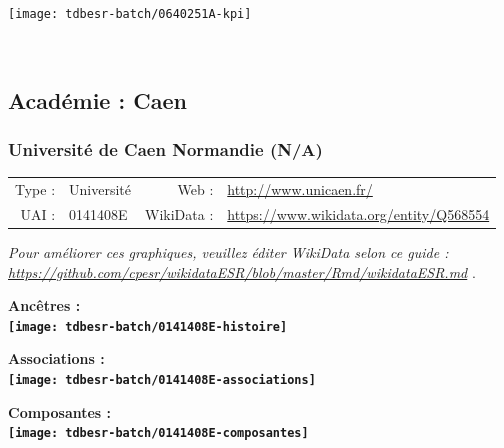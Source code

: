 \documentclass[12pt,french,]{article}
\begin{document}
\begin{center}\texttt{[image: tdbesr-batch/0640251A-kpi]} \end{center}\checkoddpage

\ifoddpage \fi ~\newpage  

\hypertarget{acaduxe9mie-caen}{%
\subsection{Académie : Caen}\label{acaduxe9mie-caen}}

\hypertarget{universituxe9-de-caen-normandie-na}{%
\subsubsection{Université de Caen Normandie
(N/A)}\label{universituxe9-de-caen-normandie-na}}

\begin{tabular*}{\textwidth}{rp{5cm}rl}  
\hline  
Type : & Université & Web : &\href{http://www.unicaen.fr/}{http://www.unicaen.fr/} \\  
UAI : & 0141408E & WikiData : & \href{https://www.wikidata.org/entity/Q568554}{https://www.wikidata.org/entity/Q568554} \\  
\hline  
\end{tabular*}

\textit{\scriptsize Pour améliorer ces graphiques, veuillez éditer WikiData selon ce guide :  \href{https://github.com/cpesr/wikidataESR/blob/master/Rmd/wikidataESR.md}{https://github.com/cpesr/wikidataESR/blob/master/Rmd/wikidataESR.md}}
.

\vspace{1cm}  
\begin{minipage}[b]{0.50\textwidth}\begin{center} \bf Ancêtres : \\  
\texttt{[image: tdbesr-batch/0141408E-histoire]} \end{center}\end{minipage}\begin{minipage}[b]{0.50\textwidth}\begin{center} \bf Associations : \\  
\texttt{[image: tdbesr-batch/0141408E-associations]} \end{center}\end{minipage}

\hrulefill

\begin{center} \bf Composantes : \\  
\texttt{[image: tdbesr-batch/0141408E-composantes]} \end{center}
\end{document}
